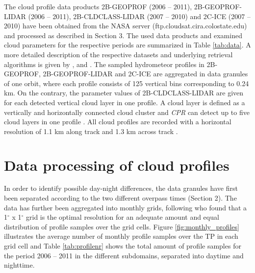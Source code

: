 \documentclass[alpha-refs]{wiley-article}
\begin{document}
The cloud profile data products 2B-GEOPROF (2006 -- 2011), 2B-GEOPROF-LIDAR (2006 -- 2011), 2B-CLDCLASS-LIDAR (2007 -- 2010) and 2C-ICE (2007 -- 2010) have been obtained from the NASA server (ftp.cloudsat.cira.colostate.edu) and processed as described in Section 3. The used data products and examined cloud parameters for the respective periods are summarized in Table \ref{tab:data}. A more detailed description of the respective datasets and underlying retrieval algorithms is given by \citet{mace2008nasa}, \citep{sassen2008classifying} and \citet{cloudsat_ice}. The sampled hydrometeor profiles in 2B-GEOPROF, 2B-GEOPROF-LIDAR and 2C-ICE are aggregated in data granules of one orbit, where each profile consists of 125 vertical bins corresponding to 0.24 km. On the contrary, the parameter values of 2B-CLDCLASS-LIDAR are given for each detected vertical cloud layer in one profile. A cloud layer is defined as a vertically and horizontally connected cloud cluster and \textit{CPR} can detect up to five cloud layers in one profile \citep{stephens2002cloudsat}. All cloud profiles are recorded with a horizontal resolution of 1.1 km along track and 1.3 km across track \citep{stephens2002cloudsat}. 



\section{Data processing of cloud profiles}

In order to identify possible day-night differences, the data granules have first been separated according to the two different overpass times (Section 2). The data has further been aggregated into monthly grids, following \citet{cu16} who found that a 1$^{\circ}$ x 1$^{\circ}$ grid is the optimal resolution for an adequate amount and equal distribution of profile samples over the grid cells. Figure \ref{fig:monthly_profiles} illustrates the average number of monthly profile samples over the TP in each grid cell and Table \ref{tab:profilenr} shows the total amount of profile samples for the period 2006 -- 2011 in the different subdomains, separated into daytime and nighttime. 
\end{document}
